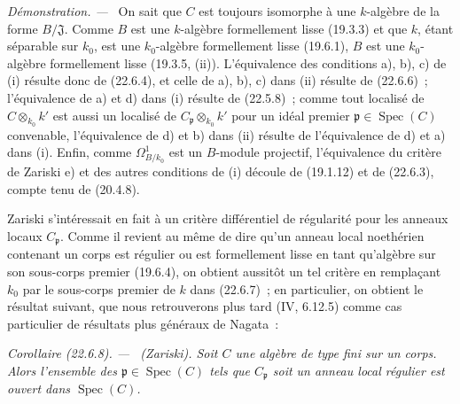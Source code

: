 \documentclass[10pt,oneside]{book}
\makeatletter
\newcommand{\setmanualcurrentlabel}[1]{\def\@currentlabel{#1}}
\newenvironment{corollary}[1][]{%
  \setmanualcurrentlabel{#1}\par\medskip\noindent\itshape Corollaire (#1). ---\ }{\par}
\newenvironment{proof}{%
  \par\medskip\noindent\textit{Démonstration. ---\ }}{\par}
\makeatother
\begin{document}
\begin{proof}
On sait que $C$ est toujours isomorphe à une $k$-algèbre de la forme
$B/\mathfrak J$. Comme $B$ est une $k$-algèbre formellement lisse (19.3.3) et
que $k$, étant séparable sur $k_0$, est une $k_0$-algèbre formellement lisse
(19.6.1), $B$ est une $k_0$-algèbre formellement lisse (19.3.5, (ii)).
L'équivalence des conditions a), b), c) de (i) résulte donc de (22.6.4), et
celle de a), b), c) dans (ii) résulte de (22.6.6)~; l'équivalence de a) et d)
dans (i) résulte de (22.5.8)~; comme tout localisé de $C\otimes_{k_0}k'$ est
aussi un localisé de $C_{\mathfrak p}\otimes_{k_0}k'$ pour un idéal premier
$\mathfrak p\in\operatorname{Spec}(C)$ convenable, l'équivalence de d) et b) dans (ii)
résulte de l'équivalence de d) et a) dans (i). Enfin, comme
$\Omega^1_{B/k_0}$ est un $B$-module projectif, l'équivalence du critère de
Zariski e) et des autres conditions de (i) découle de (19.1.12) et de
(22.6.3), compte tenu de (20.4.8).
\end{proof}

Zariski s'intéressait en fait à un critère différentiel de régularité pour les
anneaux locaux $C_{\mathfrak p}$. Comme il revient au même de dire qu'un anneau
local noethérien contenant un corps est régulier ou est formellement lisse en
tant qu'algèbre sur son sous-corps premier (19.6.4), on obtient aussitôt un tel
critère en remplaçant $k_0$ par le sous-corps premier de $k$ dans (22.6.7)~; en
particulier, on obtient le résultat suivant, que nous retrouverons plus tard
(IV, 6.12.5) comme cas particulier de résultats plus généraux de Nagata~:

\begin{corollary}[22.6.8]
\label{0.22.6.8-fr}
\textnormal{(Zariski).}
Soit $C$ une algèbre de type fini sur un corps. Alors l'ensemble des
$\mathfrak p\in\operatorname{Spec}(C)$ tels que $C_{\mathfrak p}$ soit un anneau local
régulier est ouvert dans $\operatorname{Spec}(C)$.
\end{corollary}
\end{document}
